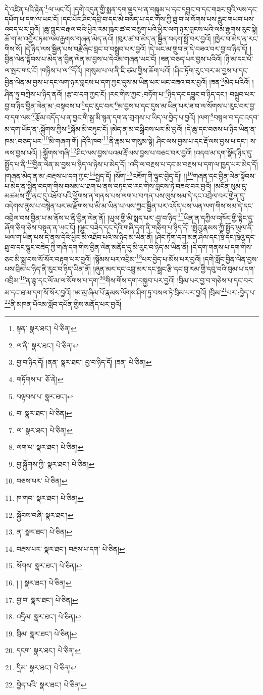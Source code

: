དེ་འཛིན་པའི་རྟེན་\footnote{སྟན་  སྣར་ཐང་།  པེ་ཅིན། }ལ་ཡང་ངོ། །དགེ་འདུན་གྱི་སྨན་དག་ལྡུད་པ་ན་བསྐྱམ་པ་དང་དབྱུང་བ་དང་གཟར་བུའི་ལས་དང་དཔོག་པ་དག་ལ་ཡང་ངོ། །དང་པོར་ཤིང་དབྲི་བ་དང་མེ་བསད་པ་དང་གོས་ཀྱི་ཐུ་བ་ལ་སོགས་པས་རླུང་གཡབ་པས་འབད་པར་བྱའོ། །ཆུ་ཀླུང་བརྒལ་བའི་ཕྱིར་རམ་ཁུར་ཚ་བ་བརྙག་པའི་ཕྱིར་ལག་ཉར་བླངས་པའི་ལམ་རྒྱགས་རུང་སྟེ། ཆོ་ག་མ་འབྱོར་ཏམ་ལམ་རྒྱགས་གཞན་མེད་ནའོ། །ཁུར་ཚ་བ་མེད་ན་སྦྱིན་བདག་སྤྲོ་བར་བྱའོ། །ཁྱེར་བ་མེད་ན་རང་གིས་སོ། །དེ་ཉིད་ལས་སྦྱིན་པས་བརྗེ་ཞིང་བླང་བ་བསྒྲུབ་པར་བྱའོ། །དེ་ཡང་མ་གྲུབ་ན་དེ་བཟའ་བར་བྱ་བ་ཉིད་དོ། །བྱིན་ལེན་སྟོབས་པ་མེད་ན་བྱིན་ལེན་མ་བྱས་པ་དེའམ་གཞན་ཡང་ངོ། །ཟན་བཅད་པར་བྱས་པའིའོ། །ཉི་མ་དང་པོ་ལ་སྤར་གང་ངོ། །གཉིས་པ་ལ་\footnote{ལ་ནི་  སྣར་ཐང་།  པེ་ཅིན། }དོའོ། །གསུམ་པ་ལ་ནི་ཇི་ཙམ་གྱིས་ཆོག་པའོ། །ཤིང་ཏོག་རུང་བར་མ་བྱས་པ་དང་བྱིན་ལེན་མ་བྱས་པ་དང་ལག་ཉར་བླངས་པ་དག་ཀྱང་དུས་མ་ཡིན་པར་ཡང་བཟའ་བར་བྱའོ། །ཟན་\footnote{བྱ་བ་ཉིད་དོ། །ནན་  སྣར་ཐང་། བྱ་བ་ཉིད་དོ། །ཟན་  པེ་ཅིན། }མེད་པའིའོ། །ཤིན་ཏུ་བཀྲེས་པ་ཉིད་ནའོ། །རྩ་བ་དག་ཀྱང་ངོ། །རང་གིས་ཀྱང་:བཏོག་པ་\footnote{གཏོགས་པ་  ཅོ་ནེ། }ཉིད་དང་དབྱུང་བ་ཉིད་དང་། བསྒྲུབ་པར་བྱ་བ་ཉིད་བྱིན་ལེན་མ་:བསྟབས་པ་\footnote{བལྟབས་པ་  སྣར་ཐང་། }དང་རུང་བར་\footnote{བ་  སྣར་ཐང་།  པེ་ཅིན། }མ་བྱས་པ་དང་དུས་མ་ཡིན་པར་ཟ་བ་ལ་སོགས་པ་རུང་བར་བྱ་བ་དག་ལས་\footnote{ལ་  སྣར་ཐང་།  པེ་ཅིན། }རྩོམ་འདོད་པ་ན་བྱང་གི་སྒྲ་མི་སྙན་དག་ན་གྲགས་པ་ཡིད་ལ་བྱེད་པ་བྱའོ། །ལག་\footnote{ལག་པ་  སྣར་ཐང་།  པེ་ཅིན། }བསྙལ་བ་དང་འདབ་མ་དག་ཡོད་ན་:སྐྱོགས་ཀྱིས་\footnote{བྱ་སྐྱོགས་ཀྱི་  སྣར་ཐང་།  པེ་ཅིན། }སྐོམ་མི་བཏུང་ངོ། །མེད་ན་མ་བསྒྲིབས་པར་མི་བྱའོ། །དེ་ཆུ་དང་བཅས་པ་ཉིད་ཡིན་ན་ཁམ་:བཅད་པར་\footnote{བཅས་པར་  པེ་ཅིན། }མི་གཞག་གོ། །དེའི་ཁབ་\footnote{ཁ་གབ་  སྣར་ཐང་།  པེ་ཅིན། }ནི་རྣམ་པ་གསུམ་སྟེ། ཤིང་ལས་བྱས་པ་དང་རྡོ་ལས་བྱས་པ་དང་། ས་ལས་བྱས་པའོ། །:སྐྱོགས་གཞི་\footnote{སྐྱོབས་བཞི་  སྣར་ཐང་། }ཤིང་ལས་བྱས་པའམ་རྡོ་ལས་བྱས་པ་བཅང་བར་བྱའོ། །འདབ་མ་དག་སྣོད་ཉིད་དུ་སྤྱོད་པ་ནི་\footnote{ན་  སྣར་ཐང་།  པེ་ཅིན། }བྱིན་ལེན་མ་བྱས་པ་ཉིད་ལ་ཉེས་པ་མེད་དོ། །འདི་ལ་བརྔས་པ་དང་མ་བརྔས་པ་དག་ལ་ཁྱད་པར་མེད་དོ། །གཞན་མེད་ན་མ་:བརྔས་པ་དག་ཀྱང་\footnote{བརྔས་པར་  སྣར་ཐང་། བརྔས་པ་དག་  པེ་ཅིན། }སྤྱད་དོ། །སོག་\footnote{སོགས་  སྣར་ཐང་།  པེ་ཅིན། }འཇོག་གི་ལྟུང་བྱེད་དོ།། །།\footnote{། །  སྣར་ཐང་།  པེ་ཅིན། }གཞན་དང་བྱིན་ལེན་སྟོབས་པ་མེད་ན་སྦྱིན་བདག་གིས་བསམ་པ་ཐག་པ་ནས་བཏང་བ་རང་གིས་བླངས་ཏེ་བཟའ་བར་བྱའོ། །མངོན་སུམ་དུ་མཚམས་ཀྱི་ནང་དུ་འཐོབ་པའི་ཕྱོགས་ན་གནས་པས་ལག་པ་བཀན་པས་ལུས་སམ་དེ་དང་འབྲེལ་བར་གྱེན་དུ་འདེགས་ནུས་པ་བསྙེན་པར་མ་རྫོགས་པ་མི་མ་ཡིན་པ་ལས་ཀྱང་སྦྱིན་པར་འདོད་པས་ཡན་ལག་གིས་སམ་དེ་དང་འབྲེལ་བས་བྱིན་པ་མ་ནོས་པ་ནི་བྱིན་ལེན་ནོ། །ཡུལ་གྱི་མི་སྨད་པར་:བྱ་བ་ཉིད་\footnote{བྱ་བ་  སྣར་ཐང་།  པེ་ཅིན། }ཡིན་ན་དཀྱིལ་འཁོར་གྱི་སྟེང་དུ་ཞོག་ཅིག་ཅེས་བསྟན་ན་ཡང་ངོ། །ལྷུང་བཟེད་དང་དེའི་གཞི་དག་ནི་གཅིག་པ་ཉིད་དོ། །སྤྲེའུ་རྣམས་ཀྱི་སྤྱོད་ཡུལ་ནི་ཡལ་ག་ཡིན་པས་དེ་ནས་དེའི་ཕྱིར་མི་འཐོབ་པའི་ས་ཉིད་མ་ཡིན་ནོ། །ཤིང་ཏོག་དག་མན་ཤེལ་དང་ཁྲི་དང་ཁྲིའུ་དང་ཐུ་བ་དང་ལྷུང་བཟེད་ཀྱི་གཞི་དག་གིས་བྱིན་ལེན་མནོད་དུ་མི་རུང་བ་ཉིད་མ་ཡིན་ནོ། །དེ་དག་གནས་པ་དག་གིས་ཅང་མི་སྨྲ་བས་སོ་སོར་བརྟག་པར་བྱའོ། །སྙོམས་པར་འབྲིམ་\footnote{འདྲིམ་  སྣར་ཐང་།  པེ་ཅིན། }པར་བྱེད་པ་མོས་པར་བྱའོ། །དགེ་སློང་བྱིན་ལེན་བྱས་པས་བྲིམ་པ་ཉིད་ནི་རུང་བ་ཉིད་ཡིན་ནོ། །ཞུན་མར་དང་འབྲུ་མར་དང་སྦྲང་རྩི་དང་བུ་རམ་གྱི་དབུ་བའི་བུམ་པ་དག་འབྲིམ་\footnote{བྲིམ་  སྣར་ཐང་།  པེ་ཅིན། }ན་རྩྭ་དང་ལོ་མ་ལ་སོགས་པ་དག་\footnote{དངག་  སྣར་ཐང་།  པེ་ཅིན། }གིས་གོས་དག་བསྐྱབ་པར་བྱའོ། །བྲིམ་པར་བྱ་བ་གཅེས་པ་དང་བར་མ་དང་ཐ་མ་དག་སོ་སོར་བྱའོ། །ཨ་མྲ་ཞིམ་པོ་རྣམས་ལོགས་ཤིག་ཏུ་བསལ་ཏེ་བྲིམ་པར་བྱའོ། །བྲིམ་\footnote{དྲིམ་  སྣར་ཐང་།  པེ་ཅིན། }པར་:བྱེད་པ་\footnote{བྱེད་པའི་  སྣར་ཐང་།  པེ་ཅིན། }ནི་མཁན་པོའམ་སློབ་དཔོན་གྱིས་མནོད་པར་བྱའོ། 